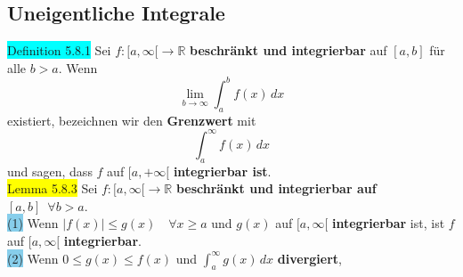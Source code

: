 \documentclass[landscape, 10pt]{article}
\newcommand{\R}{\mathbb{R}}
\begin{document}
\begin{multicols}{3}
       \subsection{Uneigentliche Integrale}
              \colorbox{cyan}{Definition 5.8.1} 
                     Sei \textcolor{NavyBlue}{
                     $f:[a,\infty[\longrightarrow\R$}
                     \textbf{beschränkt und integrierbar} auf 
                     \textcolor{NavyBlue}{$[a,b]$} für alle 
                     \textcolor{NavyBlue}{$b>a$}. 
                     Wenn 
                     \begin{equation*}
                            \lim\limits_{b\to\infty}
                            \int_a^bf(x)\,dx   
                     \end{equation*}
                     existiert, bezeichnen wir den 
                     \textbf{Grenzwert} mit
                     \begin{equation*}
                            \int_a^\infty f(x)\,dx
                     \end{equation*}
                     und sagen, dass 
                     \textcolor{NavyBlue}{$f$} auf 
                     \textcolor{NavyBlue}{$[a,+\infty[$} 
                     \textbf{integrierbar ist}.\\
              \colorbox{yellow}{Lemma 5.8.3} 
                     Sei \textcolor{NavyBlue}{
                     $f:[a,\infty[\longrightarrow\R$} 
                     \textbf{beschränkt und integrierbar auf} 
                     \textcolor{NavyBlue}{
                     $[a,b]\enspace\forall b>a$}. \\
                     \colorbox{SkyBlue}{(1)} 
                            Wenn \textcolor{NavyBlue}{
                            $|f(x)|\leqslant g(x)\quad
                            \forall x\geqslant a$}
                            und \textcolor{NavyBlue}{$g(x)$} auf 
                            \textcolor{NavyBlue}{$[a,\infty[$} 
                            \textbf{integrierbar} ist, ist 
                            \textcolor{NavyBlue}{$f$} auf 
                            \textcolor{NavyBlue}{$[a,\infty[$}
                            \textbf{integrierbar}.\\
                     \colorbox{SkyBlue}{(2)} 
                            Wenn \textcolor{NavyBlue}{
                            $0\leqslant g(x)\leqslant f(x)$} 
                            und \textcolor{NavyBlue}{
                            $\int_a^\infty g(x)\,dx$} 
                            \textbf{divergiert}, 

\end{multicols}
\end{document}
